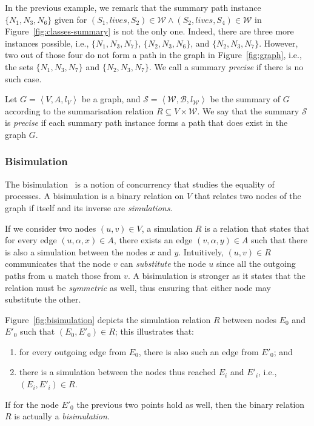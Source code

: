 In the previous example, we remark that the summary path instance $\{N_1, N_3, N_6\}$ given for $(S_1, lives, S_2) \in \mathcal{W} \wedge (S_2, lives, S_4) \in \mathcal{W}$ in Figure~\ref{fig:classes-summary} is not the only one. Indeed, there are three more instances possible, i.e., $\{N_1, N_3, N_7\}$, $\{N_2, N_3, N_6\}$, and $\{N_2, N_3, N_7\}$. However, two out of those four do not form a path in the graph in Figure~\ref{fig:graph}, i.e., the sets $\{N_1, N_3, N_7\}$ and $\{N_2, N_3, N_7\}$. We call a summary \emph{precise} if there is no such case.

\begin{definition}
Let $G=\left\langle V, A, l_V \right\rangle$ be a graph, and $\mathcal{S} = \left\langle \mathcal{W}, \mathcal{B}, l_{\mathcal{W}} \right\rangle$ be the summary of $G$ according to the summarisation relation $R \subseteq V \times \mathcal{W}$.
We say that the summary $\mathcal{S}$ is \emph{precise} if each summary path instance forms a path that does exist in the graph $G$.
\end{definition}

\subsubsection{Bisimulation}
\label{chap:summary:bisim}

The bisimulation~\cite{park:1981:cai} is a notion of concurrency that studies the equality of processes.
A bisimulation is a binary relation on $V$ that relates two nodes of the graph if itself and its inverse are \emph{simulations}.

If we consider two nodes $(u, v) \in V$, a simulation $R$ is a relation that states that for every edge $(u, \alpha, x) \in A$, there exists an edge $(v,\alpha, y) \in A$ such that there is also a simulation between the nodes $x$ and $y$. Intuitively, $(u,v) \in R$ communicates that the node $v$ can \emph{substitute} the node $u$ since all the outgoing paths from $u$ match those from $v$. A bisimulation is stronger as it states that the relation must be \emph{symmetric} as well, thus ensuring that either node may substitute the other.

Figure~\ref{fig:bisimulation} depicts the simulation relation $R$ between nodes $E_0$ and $E'_0$ such that $(E_0, E'_0) \in R$; this illustrates that:
\begin{enumerate}
	\item for every outgoing edge from $E_0$, there is also such an edge from $E'_0$; and
	\item there is a simulation between the nodes thus reached $E_i$ and $E'_i$, i.e., $(E_i, E'_i) \in R$.
\end{enumerate}
If for the node $E'_0$ the previous two points hold as well, then the binary relation $R$ is actually a \emph{bisimulation}.

